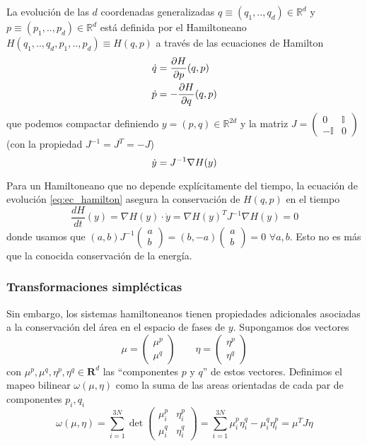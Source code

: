 La evolución de las $d$ coordenadas generalizadas $q \equiv (q_1,..,q_d)\in\mathbb{R}^{d}$ y $p \equiv (p_1,..,p_d)\in\mathbb{R}^{d}$ está definida por el Hamiltoneano
$H(q_1,..,q_d,p_1,..,p_d) \equiv H(q,p)$  a través de las ecuaciones de Hamilton
\begin{align*}
 \dot{q} &= \frac{\partial H}{\partial p}(q,p) \\
 \dot{p} &= -\frac{\partial H}{\partial q}(q,p)
\end{align*}
que podemos compactar definiendo $y=(p,q)\in\mathbb{R}^{2d}$ y la matriz $J = \begin{pmatrix}0 & \mathbb{I} \\-\mathbb{I} & 0\end{pmatrix}$ (con la propiedad $J^{-1} = J^T = -J$)
\begin{equation}{\label{eq:ec_hamilton}}
 \dot{y} = J^{-1}\nabla H(y)
\end{equation}

Para un Hamiltoneano que no depende explícitamente del tiempo, la ecuación de evolución \ref{eq:ec_hamilton} asegura la conservación de $H(q,p)$ en el tiempo
\[ \frac{dH}{dt}(y) = \nabla H(y)\cdot \dot{y} = \nabla H(y)^T J^{-1}\nabla H(y) = 0\]
donde usamos que $(a,b)J^{-1}\begin{pmatrix}a\\b\end{pmatrix} = (b, -a)\begin{pmatrix}a\\b\end{pmatrix} = 0$ $\forall a,b$.
Esto no es más que la conocida conservación de la energía.

\subsubsection{Transformaciones simplécticas}{\label{sec:trans_simp}}

Sin embargo, los sistemas hamiltoneanos tienen propiedades adicionales asociadas a la conservación del área en el espacio de fases de $y$.
Supongamos dos vectores
\[ \mu = \begin{pmatrix} \mu^p\\ \mu^q \end{pmatrix} \qquad \eta = \begin{pmatrix} \eta^p\\ \eta^q \end{pmatrix}  \]
con $\mu^p, \mu^q, \eta^p, \eta^q\in\mathbf{R}^{d}$ las ``componentes $p$ y $q$'' de estos vectores.
Definimos el mapeo bilinear $\omega(\mu,\eta)$ como la suma de las areas orientadas de cada par de componentes $p_i,q_i$
\begin{equation}
 \omega(\mu, \eta) = \sum_{i=1}^{3N} \det \begin{pmatrix} \mu^p_i & \eta^p_i \\ \mu^q_i & \eta^q_i \end{pmatrix} = \sum_{i=1}^{3N} \mu^p_i\eta^q_i - \mu^q_i\eta^p_i = \mu^T J \eta
\end{equation}

